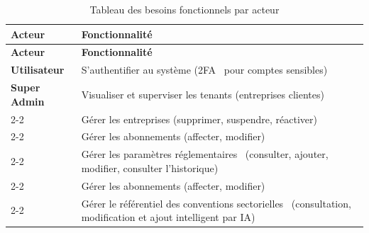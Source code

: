 \begin{longtable}{|p{3.5cm}|p{\dimexpr\linewidth-3.5cm-4\tabcolsep-2\arrayrulewidth}|}

\hline
\rowcolor[HTML]{EFEFEF}
\textbf{Acteur} & \textbf{Fonctionnalité} \\ \hline
\endfirsthead

\hline
\rowcolor[HTML]{EFEFEF}
\textbf{Acteur} & \textbf{Fonctionnalité} \\ \hline
\endhead

\hline
\endfoot
\hline
\caption{Tableau des besoins fonctionnels par acteur}
\label{tab:besoins-fonctionnels}
\endlastfoot

\textbf{Utilisateur} & S'authentifier au système (2FA~\cite{totp} pour comptes sensibles) \\ \hline

{\textbf{Super Admin}}
    & Visualiser et superviser les tenants (entreprises clientes) \\ \cline{2-2}
    & Gérer les entreprises (supprimer, suspendre, réactiver) \\ \cline{2-2}
    & Gérer les abonnements (affecter, modifier) \\ \cline{2-2}
    & Gérer les paramètres réglementaires~\cite{loifinance} (consulter, ajouter, modifier, consulter l'historique) \\ \cline{2-2}
    & Gérer les abonnements (affecter, modifier) \\ \cline{2-2}
    & Gérer le référentiel des conventions sectorielles~\cite{cdt} (consultation, modification et ajout intelligent par IA)\\ \hline


\end{longtable}

